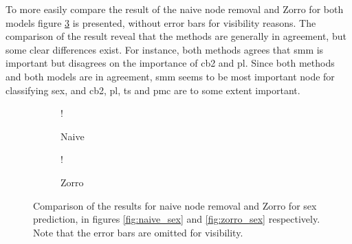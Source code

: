 To more easily compare the result of the naive node removal and Zorro for both models figure \ref{fig:comparison_sex} is presented, without error bars for visibility reasons. The comparison of the result reveal that the methods are generally in agreement, but some clear differences exist. For instance, both methods agrees that \acrshort{smm} is important but disagrees on the importance of \acrshort{cb2} and \acrshort{pl}. Since both methods and both models are in agreement, \acrshort{smm} seems to be most important node for classifying sex, and \acrshort{cb2}, \acrshort{pl}, \acrshort{ts} and \acrshort{pmc} are to some extent important.

\begin{figure}[!htbp]
    \centering
        \begin{subfigure}{.5\textwidth}
            \centering
            \begin{center}
                \resizebox {1.0\linewidth} {!} {
                    
                }
            \end{center}
            \caption{Naive}
            \label{fig:comparison_sex_naive}
        \end{subfigure}%
        \begin{subfigure}{.5\textwidth}
            \centering
            \begin{center}
                \resizebox {1.0\linewidth} {!} {
                    
                }
            \end{center}
            \caption{Zorro}
            \label{fig:comparison_sex_zorro}
        \end{subfigure}
    \caption{Comparison of the results for naive node removal and Zorro for sex prediction, in figures \ref{fig:naive_sex} and \ref{fig:zorro_sex} respectively. Note that the error bars are omitted for visibility.}
    \label{fig:comparison_sex}
\end{figure}



